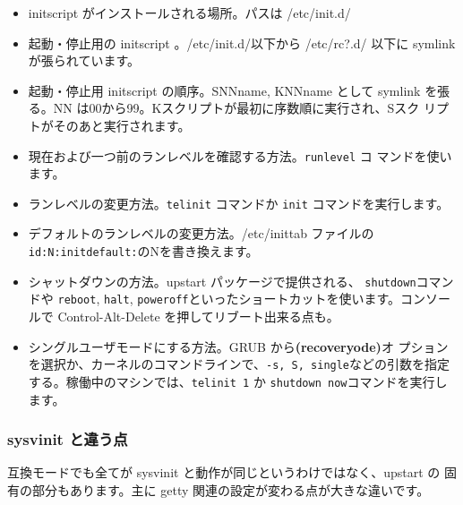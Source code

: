 \documentclass[mingoth,a4paper]{jsarticle}
\begin{document}
\begin{itemize}
 \item initscript がインストールされる場所。パスは /etc/init.d/
 \item 起動・停止用の initscript 。/etc/init.d/以下から /etc/rc?.d/
       以下に symlink が張られています。
 \item 起動・停止用 initscript の順序。SNNname, KNNname として symlink
       を張る。NN は00から99。Kスクリプトが最初に序数順に実行され、Sスク
       リプトがそのあと実行されます。
 \item 現在および一つ前のランレベルを確認する方法。\texttt{runlevel} コ
       マンドを使います。
 \item ランレベルの変更方法。\texttt{telinit} コマンドか \texttt{init}
       コマンドを実行します。
 \item デフォルトのランレベルの変更方法。/etc/inittab ファイルの
       \texttt{id:N:initdefault:}のNを書き換えます。
 \item シャットダウンの方法。upstart パッケージで提供される、
       \texttt{shutdown}コマンドや \texttt{reboot}, \texttt{halt},
       \texttt{poweroff}といったショートカットを使います。コンソールで
       Control-Alt-Delete を押してリブート出来る点も。
\item シングルユーザモードにする方法。GRUB から\textbf{(recoveryode)}オ
      プションを選択か、カーネルのコマンドラインで、\texttt{-s, S,
      single}などの引数を指定する。稼働中のマシンでは、\texttt{telinit
      1} か \texttt{shutdown now}コマンドを実行します。
\end{itemize}

\subsubsection{sysvinit と違う点}
\label{se:difference-sysvinit}

互換モードでも全てが sysvinit と動作が同じというわけではなく、upstart の
固有の部分もあります。主に getty 関連の設定が変わる点が大きな違いです。
\end{document}

